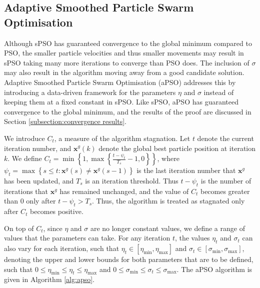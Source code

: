 \documentclass[12pt]{article}
\newcommand{\mb}[1]{\mathbf{#1}}
\theoremstyle{definition}
\begin{document}
\subsection{Adaptive Smoothed Particle Swarm Optimisation}
\label{subsection:apso algorithm}
Although sPSO has guaranteed convergence to the global minimum compared to PSO, the smaller particle velocities and thus smaller movements may result in sPSO taking many more iterations to converge than PSO does. The inclusion of $\sigma$ may also result in the algorithm moving away from a good candidate solution. Adaptive Smoothed Particle Swarm Optimisation (aPSO) addresses this by introducing a data-driven framework for the parameters $\eta$ and $\sigma$ instead of keeping them at a fixed constant in sPSO. Like sPSO, aPSO has guaranteed convergence to the global minimum, and the results of the proof are discussed in Section \ref{subsection:convergence results}. \newline

We introduce $C_t$, a measure of the algorithm stagnation. Let $t$ denote the current iteration number, and $\mb{x}^g(k)$ denote the global best particle position at iteration $k$. We define $C_t = \min \left\{1, \max \left\{\frac{t - \psi_t}{T_s} - 1, 0 \right\}\right\}$, where $\psi_t = \max \left\{s \leq t: \mb{x}^g(s) \neq \mb{x}^g(s-1) \right\}$ is the last iteration number that $\mb{x}^g$ has been updated, and $T_s$ is an iteration threshold. Thus $t - \psi_t$ is the number of iterations that $\mb{x}^g$ has remained unchanged, and the value of $C_t$ becomes greater than $0$ only after $t - \psi_t > T_s$. Thus, the algorithm is treated as stagnated only after $C_t$ becomes positive. \newline

On top of $C_t$, since $\eta$ and $\sigma$ are no longer constant values, we define a range of values that the parameters can take. For any iteration $t$, the values $\eta_t$ and $\sigma_t$ can also vary for each iteration, such that $\eta_t \in \left[\eta_\text{min}, \eta_\text{max}\right]$ and $\sigma_t \in \left[\sigma_\text{min}, \sigma_\text{max}\right]$, denoting the upper and lower bounds for both parameters that are to be defined, such that $0 \leq \eta_\text{min} \leq \eta_t \leq \eta_\text{max}$ and $0 \leq \sigma_\text{min} \leq \sigma_t \leq \sigma_\text{max}$. The aPSO algorithm is given in Algorithm \ref{alg:apso}.
\end{document}

